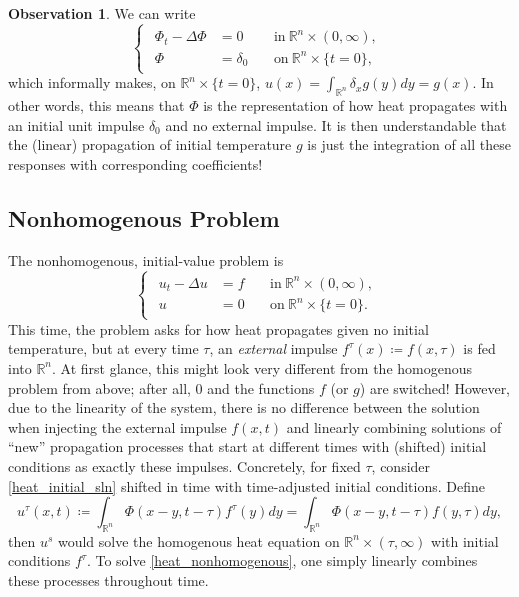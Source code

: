 \documentclass[openany, amssymb, psamsfonts]{amsart}
\theoremstyle{definition}
\newtheorem{obs}{Observation}[section]
\numberwithin{equation}{section}
\newcommand{\bbr}{\mathbb{R}}
\begin{document}
\begin{obs}
We can write 
\begin{equation}
\begin{cases}
    \begin{aligned}
        \Phi_t - \Delta \Phi &= 0 && \:\text{in}\: \bbr^n \times (0, \infty) ,\\
        \Phi &= \delta_0 &&\:\text{on}\: \bbr^n \times \{t = 0\},
    \end{aligned}
\end{cases}
\end{equation}
which informally makes, on $\bbr^n \times \{t = 0\}$, $u(x) = \int_{\bbr^n} \delta_x g(y) dy = g(x)$. In other words, this means that $\Phi$ is the representation of how heat propagates with an initial unit impulse  $\delta_0$ and no external impulse. It is then understandable that the (linear) propagation of initial temperature $g$ is just the integration of all these responses with corresponding coefficients!
\end{obs}

\subsection{Nonhomogenous Problem}
The nonhomogenous, initial-value problem is 
\begin{equation} \label{heat_nonhomogenous}
    \begin{cases}
        \begin{aligned}
            u_t - \Delta u &= f && \:\text{in}\: \bbr^n \times (0, \infty) ,\\
            u &= 0 && \:\text{on}\: \bbr^n \times \{t = 0\} .
        \end{aligned}
    \end{cases}
\end{equation}
This time, the problem asks for how heat propagates given no initial temperature, but at every time $\tau$, an \textit{external} impulse $f^\tau(x) \coloneqq f(x, \tau)$ is fed into $\bbr^n$. At first glance, this might look very different from the homogenous problem from above; after all, $0$ and the functions $f$ (or $g$) are switched! However, due to the linearity of the system, there is no difference between the solution when injecting the external impulse $f(x, t)$ and linearly combining solutions of ``new'' propagation processes that start at different times with (shifted) initial conditions as exactly these impulses. Concretely, for fixed $\tau$, consider \eqref{heat_initial_sln} shifted in time with time-adjusted initial conditions. Define
\begin{equation}
u^\tau(x, t) \coloneqq \int_{\bbr^n} \Phi(x-y, t-\tau) f^\tau(y) dy  = \int_{\bbr^n} \Phi(x-y, t-\tau) f(y, \tau) dy,
\end{equation}
then $u^s$ would solve the homogenous heat equation on $\bbr^n \times (\tau, \infty)$ with initial conditions $f^\tau$. To solve \eqref{heat_nonhomogenous}, one simply linearly combines these processes throughout time.
\end{document}
